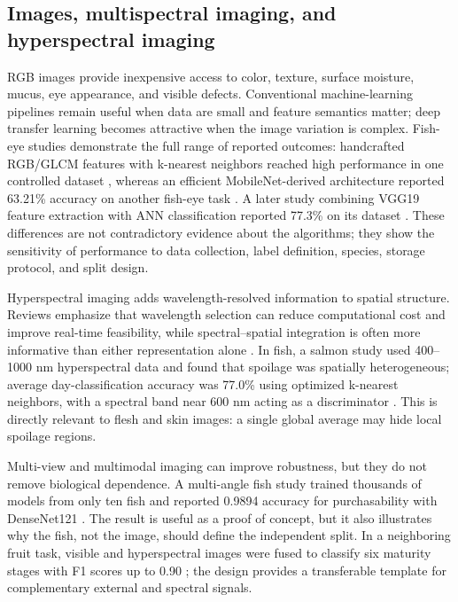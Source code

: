 \documentclass[11pt]{article}
\begin{document}
\subsection{Images, multispectral imaging, and hyperspectral imaging}

RGB images provide inexpensive access to color, texture, surface moisture, mucus, eye appearance, and visible defects. Conventional machine-learning pipelines remain useful when data are small and feature semantics matter; deep transfer learning becomes attractive when the image variation is complex. Fish-eye studies demonstrate the full range of reported outcomes: handcrafted RGB/GLCM features with k-nearest neighbors reached high performance in one controlled dataset \citep{Yudhana2022fish}, whereas an efficient MobileNet-derived architecture reported 63.21\% accuracy on another fish-eye task \citep{Prasetyo2022combining}. A later study combining VGG19 feature extraction with ANN classification reported 77.3\% on its dataset \citep{Yildiz2024fisheye}. These differences are not contradictory evidence about the algorithms; they show the sensitivity of performance to data collection, label definition, species, storage protocol, and split design.

Hyperspectral imaging adds wavelength-resolved information to spatial structure. Reviews emphasize that wavelength selection can reduce computational cost and improve real-time feasibility, while spectral--spatial integration is often more informative than either representation alone \citep{Saha2021machine,Ozdogan2021rapid}. In fish, a salmon study used 400--1000 nm hyperspectral data and found that spoilage was spatially heterogeneous; average day-classification accuracy was 77.0\% using optimized k-nearest neighbors, with a spectral band near 600 nm acting as a discriminator \citep{Hardy2024does}. This is directly relevant to flesh and skin images: a single global average may hide local spoilage regions.

Multi-view and multimodal imaging can improve robustness, but they do not remove biological dependence. A multi-angle fish study trained thousands of models from only ten fish and reported 0.9894 accuracy for purchasability with DenseNet121 \citep{Hamidy2025deep}. The result is useful as a proof of concept, but it also illustrates why the fish, not the image, should define the independent split. In a neighboring fruit task, visible and hyperspectral images were fused to classify six maturity stages with F1 scores up to 0.90 \citep{GarillosManliguez2021multimodal}; the design provides a transferable template for complementary external and spectral signals.
\end{document}
